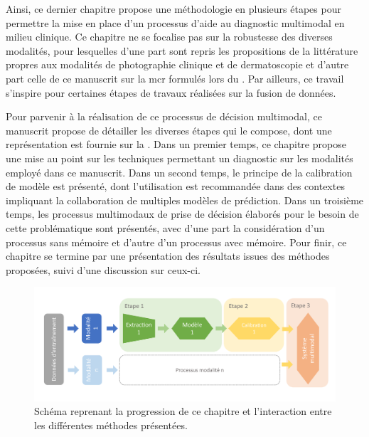 Ainsi, ce dernier chapitre propose une méthodologie en plusieurs étapes pour permettre la mise en place d'un processus d'aide au diagnostic multimodal en milieu clinique. Ce chapitre ne se focalise pas sur la robustesse des diverses modalités, pour lesquelles d'une part sont repris les propositions de la littérature propres aux modalités de photographie clinique et de dermatoscopie et d'autre part celle de ce manuscrit sur la \gls{mcr} formulés lors du . Par ailleurs, ce travail s'inspire pour certaines étapes de travaux réalisées sur la fusion de données.

Pour parvenir à la réalisation de ce processus de décision multimodal, ce manuscrit propose de détailler les diverses étapes qui le compose, dont une représentation est fournie sur la . Dans un premier temps, ce chapitre propose une mise au point sur les techniques permettant un diagnostic sur les modalités employé dans ce manuscrit. Dans un second temps, le principe de la calibration de modèle est présenté, dont l'utilisation est recommandée dans des contextes impliquant la collaboration de multiples modèles de prédiction. Dans un troisième temps, les processus multimodaux de prise de décision élaborés pour le besoin de cette problématique sont présentés, avec d'une part la considération d'un processus sans mémoire et d'autre d'un processus avec mémoire. Pour finir, ce chapitre se termine par une présentation des résultats issues des méthodes proposées, suivi d'une discussion sur ceux-ci.\par

\begin{figure}[H]
    \centering
    \includegraphics[width=0.9\linewidth]{contents/chapter_8/resources/scheme_multimodal_methodology.pdf}
    \caption{Schéma reprenant la progression de ce chapitre et l'interaction entre les différentes méthodes présentées.}
    \label{fig:scheme_multimodal_methodology}
\end{figure}\par


